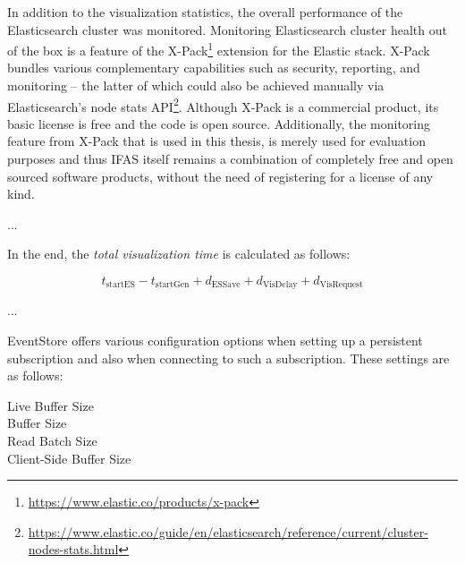 In addition to the visualization statistics, the overall performance of the Elasticsearch cluster was monitored.
Monitoring Elasticsearch cluster health out of the box is a feature of the X-Pack\footnote{\url{https://www.elastic.co/products/x-pack}} extension for the Elastic stack.
X-Pack bundles various complementary capabilities such as security, reporting, and monitoring -- the latter of which could also be achieved manually via Elasticsearch's node stats API\footnote{\url{https://www.elastic.co/guide/en/elasticsearch/reference/current/cluster-nodes-stats.html}}.
Although X-Pack is a commercial product, its basic license is free and the code is open source.
Additionally, the monitoring feature from X-Pack that is used in this thesis, is merely used for evaluation purposes and thus \ac{IFAS} itself remains a combination of completely free and open sourced software products, without the need of registering for a license of any kind.

...

In the end, the \emph{total visualization time} is calculated as follows:

$$t_\text{startES} - t_\text{startGen}+ d_\text{ESSave} + d_\text{VisDelay} + d_\text{VisRequest}$$


...

EventStore offers various configuration options when setting up a persistent subscription and also when connecting to such a subscription.
These settings are as follows:

\begin{description}
\item[Live Buffer Size] %
\item[Buffer Size] %
\item[Read Batch Size] %
\item[Client-Side Buffer Size] %
\end{description}

